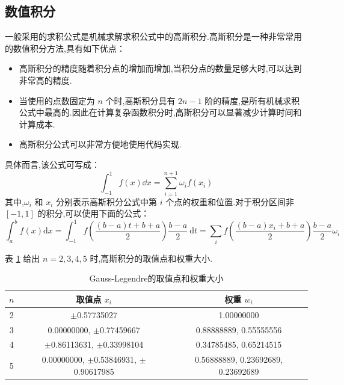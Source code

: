 \documentclass{book}
\begin{document}
\begin{example}
\begin{example}{}{}
\begin{example}
\begin{example}
\begin{example}
\begin{example}
\begin{example}{}{}
\begin{example}
\section{数值积分}

一般采用的求积公式是机械求解求积公式中的高斯积分.高斯积分是一种非常常用的数值积分方法,具有如下优点：
\begin{itemize}
    \item 高斯积分的精度随着积分点的增加而增加,当积分点的数量足够大时,可以达到非常高的精度.
    \item 当使用的点数固定为 $n$ 个时,高斯积分具有 $2n-1$ 阶的精度,是所有机械求积公式中最高的.因此在计算复杂函数积分时,高斯积分可以显著减少计算时间和计算成本.
    \item 高斯积分公式可以非常方便地使用代码实现.
\end{itemize}
具体而言,该公式可写成：
\begin{equation}
    \int_{-1}^1 f(x)\dd x=\sum_{i=1}^{n+1}\omega_if(x_i)
\end{equation}
其中,$\omega_i$ 和 $x_i$ 分别表示高斯积分公式中第 $i$ 个点的权重和位置.对于积分区间非 $[-1,1]$ 的积分,可以使用下面的公式：
\begin{equation}
    \int_{a}^{b} f(x) \mathrm{d} x=\int_{-1}^{1} f\left(\frac{(b-a) t+b+a}{2}\right) \frac{b-a}{2} \mathrm{~d} t=\sum_i f(\frac{(b-a)x_i+b+a}{2})\frac{b-a}{2}\omega_i
\end{equation}

表 \ref{tab:Gauss-Legendre积分} 给出 $n=2,3,4,5$ 时,高斯积分的取值点和权重大小.
\begin{table}[ht]
    \centering
    \caption{Gauss-Legendre的取值点和权重大小}
    \label{tab:Gauss-Legendre积分}
    \begin{tabular}{ccc}
        \toprule
        $n$ & 取值点 $x_i$                                 & 权重 $w_i$                         \\
        \midrule
        2   & $\pm$0.57735027                              & 1.00000000                         \\
        3   & 0.00000000, $\pm$0.77459667                  & 0.88888889, 0.55555556             \\
        4   & $\pm$0.86113631, $\pm$0.33998104             & 0.34785485, 0.65214515             \\
        5   & 0.00000000, $\pm$0.53846931, $\pm$0.90617985 & 0.56888889, 0.23692689, 0.23692689 \\
        \bottomrule
    \end{tabular}
\end{table}



\end{example}
\end{example}
\end{example}
\end{example}
\end{example}
\end{example}
\end{example}
\end{example}
\end{document}

